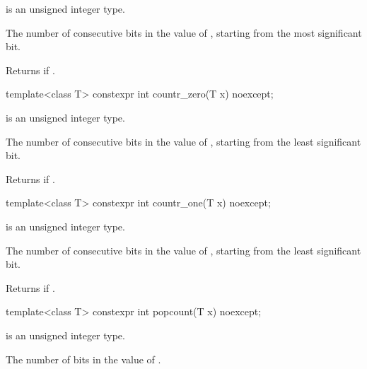%
\begin{itemdescr}
\pnum
\constraints
{} is an unsigned integer type.

\pnum
\returns
The number of consecutive  bits in the value of ,
starting from the most significant bit.
\begin{note}
Returns  if .
\end{note}
\end{itemdescr}

\begin{itemdecl}
template<class T>
  constexpr int countr_zero(T x) noexcept;
\end{itemdecl}

%
\begin{itemdescr}
\pnum
\constraints
{} is an unsigned integer type.

\pnum
\returns
The number of consecutive  bits in the value of ,
starting from the least significant bit.
\begin{note}
Returns  if .
\end{note}
\end{itemdescr}

\begin{itemdecl}
template<class T>
  constexpr int countr_one(T x) noexcept;
\end{itemdecl}

%
\begin{itemdescr}
\pnum
\constraints
{} is an unsigned integer type.

\pnum
\returns
The number of consecutive  bits in the value of ,
starting from the least significant bit.
\begin{note}
Returns  if .
\end{note}
\end{itemdescr}

\begin{itemdecl}
template<class T>
  constexpr int popcount(T x) noexcept;
\end{itemdecl}

%
\begin{itemdescr}
\pnum
\constraints
{} is an unsigned integer type.

\pnum
\returns
The number of  bits in the value of .
\end{itemdescr}

